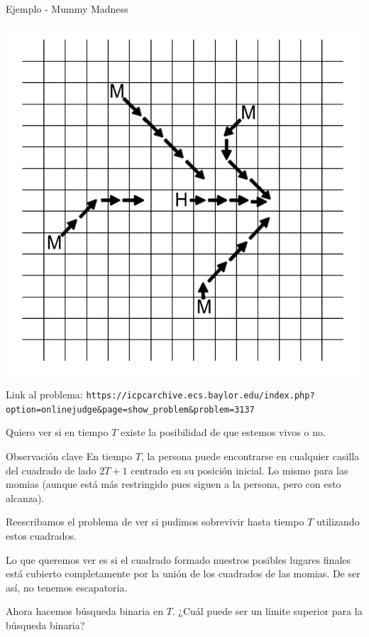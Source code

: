\documentclass[compress]{beamer}
\newcommand{\bigpause}{\bigskip \pause}
\begin{document}
\begin{frame}{Ejemplo - Mummy Madness}

\begin{center}
\includegraphics[scale=0.2]{images/mummy_chase.png}
\end{center}

{\footnotesize
Link al problema: \texttt{https://icpcarchive.ecs.baylor.edu/index.php?option=onlinejudge\&page=show\_problem\&problem=3137}
}
\end{frame}

\begin{frame}
Quiero ver si en tiempo $T$ existe la posibilidad de que estemos vivos o no.

\begin{block}{Observación clave}
En tiempo $T$, la persona puede encontrarse en cualquier casilla del
cuadrado de lado $2T+1$ centrado en su posición inicial. Lo mismo para
las momias (aunque está más restringido pues siguen a la persona, pero
con esto alcanza).
\end{block}

Reescribamos el problema de ver si pudimos sobrevivir hasta tiempo $T$
utilizando estos cuadrados.

\end{frame}

\begin{frame}

Lo que queremos ver es si el cuadrado formado nuestros posibles lugares
finales está cubierto completamente por la unión de los cuadrados de las 
momias. De ser así, no tenemos escapatoria. 

\bigpause

Ahora hacemos búsqueda binaria en $T$. ¿Cuál puede ser un límite superior
para la búsqueda binaria?

\end{frame}
\end{document}
